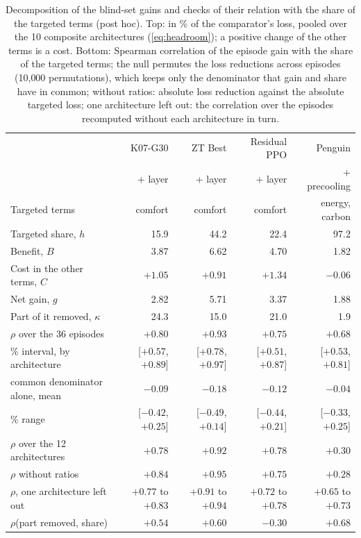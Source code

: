 \begin{table}[!htbp]
\centering
\caption{Decomposition of the blind-set gains and checks of their relation with the share of the targeted terms (post hoc).
Top: in \% of the comparator's loss, pooled over the 10 composite architectures (\cref{eq:headroom}); a positive change of
the other terms is a cost. Bottom: Spearman correlation of the episode gain with the share of the targeted terms; the null permutes the loss
reductions across episodes (10{,}000 permutations), which keeps only the denominator that gain and share have in common;
without ratios: absolute loss reduction against the absolute targeted loss; one architecture left out: the correlation over
the episodes recomputed without each architecture in turn.}
\label{tab:headroom}
\footnotesize
\setlength{\tabcolsep}{4pt}
\begin{tabular}{@{}lrrrr@{}}
\toprule
 & K07-G30 & ZT Best & Residual PPO & Penguin\\
 & + layer & + layer & + layer & + precooling\\
\midrule
Targeted terms & comfort & comfort & comfort & energy, carbon\\
Targeted share, $h$ & 15.9 & 44.2 & 22.4 & 97.2\\
Benefit, $B$ & 3.87 & 6.62 & 4.70 & 1.82\\
Cost in the other terms, $C$ & $+1.05$ & $+0.91$ & $+1.34$ & $-0.06$\\
Net gain, $g$ & 2.82 & 5.71 & 3.37 & 1.88\\
Part of it removed, $\kappa$ & 24.3 & 15.0 & 21.0 & 1.9\\
\midrule
$\rho$ over the 36 episodes & $+0.80$ & $+0.93$ & $+0.75$ & $+0.68$\\
\quad 95\% interval, by architecture & [$+0.57$, $+0.89$] & [$+0.78$, $+0.97$] & [$+0.51$, $+0.87$] & [$+0.53$, $+0.81$]\\
\quad common denominator alone, mean & $-0.09$ & $-0.18$ & $-0.12$ & $-0.04$\\
\quad\quad 95\% range & [$-0.42$, $+0.25$] & [$-0.49$, $+0.14$] & [$-0.44$, $+0.21$] & [$-0.33$, $+0.25$]\\
$\rho$ over the 12 architectures & $+0.78$ & $+0.92$ & $+0.78$ & $+0.30$\\
$\rho$ without ratios & $+0.84$ & $+0.95$ & $+0.75$ & $+0.28$\\
$\rho$, one architecture left out & $+0.77$ to $+0.83$ & $+0.91$ to $+0.94$ & $+0.72$ to $+0.78$ & $+0.65$ to $+0.73$\\
$\rho$(part removed, share) & $+0.54$ & $+0.60$ & $-0.30$ & $+0.68$\\
\bottomrule
\end{tabular}
\end{table}

